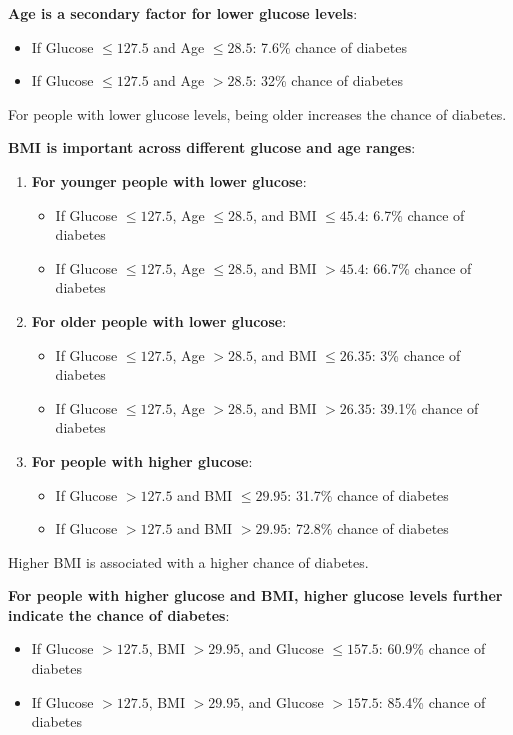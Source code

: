 \documentclass{article}
\begin{document}
\begin{enumerate}[leftmargin=\labelsep]
    \textbf{Age is a secondary factor for lower glucose levels}:
    \begin{itemize}
        \item If Glucose $\leq 127.5$ and Age $\leq 28.5$: 7.6\% chance of diabetes
        \item If Glucose $\leq 127.5$ and Age $> 28.5$: 32\% chance of diabetes
    \end{itemize}
    For people with lower glucose levels, being older increases the chance of diabetes.

    \textbf{BMI is important across different glucose and age ranges}:
    \begin{enumerate}[label=\alph*.]
        \item \textbf{For younger people with lower glucose}:
        \begin{itemize}
            \item If Glucose $\leq 127.5$, Age $\leq 28.5$, and BMI $\leq 45.4$: 6.7\% chance of diabetes
            \item If Glucose $\leq 127.5$, Age $\leq 28.5$, and BMI $> 45.4$: 66.7\% chance of diabetes
        \end{itemize}

        \item \textbf{For older people with lower glucose}:
        \begin{itemize}
            \item If Glucose $\leq 127.5$, Age $> 28.5$, and BMI $\leq 26.35$: 3\% chance of diabetes
            \item If Glucose $\leq 127.5$, Age $> 28.5$, and BMI $> 26.35$: 39.1\% chance of diabetes
        \end{itemize}

        \item \textbf{For people with higher glucose}:
        \begin{itemize}
            \item If Glucose $> 127.5$ and BMI $\leq 29.95$: 31.7\% chance of diabetes
            \item If Glucose $> 127.5$ and BMI $> 29.95$: 72.8\% chance of diabetes
        \end{itemize}
    \end{enumerate}
    Higher BMI is associated with a higher chance of diabetes.

    \textbf{For people with higher glucose and BMI, higher glucose levels further indicate the chance of diabetes}:
    \begin{itemize}
        \item If Glucose $> 127.5$, BMI $> 29.95$, and Glucose $\leq 157.5$: 60.9\% chance of diabetes
        \item If Glucose $> 127.5$, BMI $> 29.95$, and Glucose $> 157.5$: 85.4\% chance of diabetes
    \end{itemize}


\end{enumerate}

\end{document}
